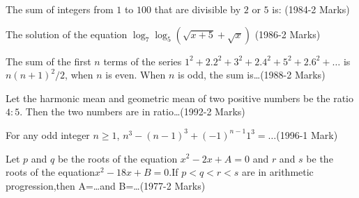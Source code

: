 \iffalse
\title{Assignment1}
\author{Dasari Manikanta}
\section{fitb}
\fi
\item  The sum of integers from $1$ to $100$ that are divisible by $2$ or $5$ is: \hfill{(1984-2 Marks)}
    
    
	    \item  The solution of the equation                                    
		    ${\log_{7}\log_{5}(\sqrt{x+5}+\sqrt{x})}$ \hfill{(1986-2 Marks)}
     
     
	     \item The sum of the first $n$ terms of the series ${1^2+2.2^2+3^2+2.4^2+5^2+2.6^2+\dots}$ is
   ${n (n+1)^2 /2}$, when $n$ is even. When $n$ is odd, the sum 
   is\dots\hfill{(1988-2 Marks)}
        
          
		  \item Let the harmonic mean and geometric mean of two positive numbers be the ratio $4:5$. Then the two numbers are in 
			  ratio\dots\hfill{(1992-2 Marks)}
          
     
		  \item For any odd integer $n \ge 1$, ${n^3-(n-1)^3+(-1)^{n-1} 1^3=\dots}$\hfill{(1996-1 Mark)}
       
     
		  \item  Let $p$ and $q$ be the roots of the equation                    ${x^2-2x+A=0}$ and $r$ and $s$ be the roots of the                     equation${x^2-18x+B=0}$.If ${p<q<r<s}$ are                                      in arithmetic progression,then A=\dots and B=\dots\hfill{(1977-2 Marks)}
     
